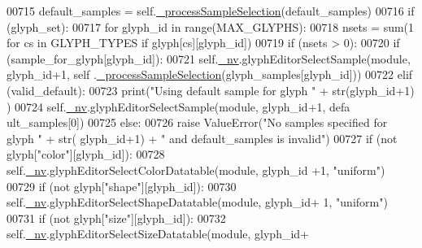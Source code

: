 \begin{DoxyCode}
00715         default\_samples = self.\hyperlink{classnavicom_1_1navicom_1_1NaviCom_a2acd087f6c61dc8c7e1bc5a3391ff982}{_processSampleSelection}(default\_samples)
00716         \textcolor{keywordflow}{if} (glyph\_set):
00717             \textcolor{keywordflow}{for} glyph\_id \textcolor{keywordflow}{in} range(MAX\_GLYPHS):
00718                 nsets = sum(1 \textcolor{keywordflow}{for} cs \textcolor{keywordflow}{in} GLYPH\_TYPES \textcolor{keywordflow}{if} glyph[cs][glyph\_id])
00719                 \textcolor{keywordflow}{if} (nsets > 0):
00720                     \textcolor{keywordflow}{if} (sample\_for\_glyph[glyph\_id]):
00721                         self.\hyperlink{classnavicom_1_1navicom_1_1NaviCom_afff3fd56fa16a68bab52ba8d801e325a}{_nv}.glyphEditorSelectSample(module, glyph\_id+1, self
      .\hyperlink{classnavicom_1_1navicom_1_1NaviCom_a2acd087f6c61dc8c7e1bc5a3391ff982}{_processSampleSelection}(glyph\_samples[glyph\_id]))
00722                     \textcolor{keywordflow}{elif} (valid\_default):
00723                         \textcolor{keywordflow}{print}(\textcolor{stringliteral}{"Using default sample for glyph "} + str(glyph\_id+1)
      )
00724                         self.\hyperlink{classnavicom_1_1navicom_1_1NaviCom_afff3fd56fa16a68bab52ba8d801e325a}{_nv}.glyphEditorSelectSample(module, glyph\_id+1, defa
      ult\_samples[0])
00725                     \textcolor{keywordflow}{else}:
00726                         \textcolor{keywordflow}{raise} ValueError(\textcolor{stringliteral}{"No samples specified for glyph "} + str(
      glyph\_id+1) + \textcolor{stringliteral}{" and default\_samples is invalid"})
00727                     \textcolor{keywordflow}{if} (\textcolor{keywordflow}{not} glyph[\textcolor{stringliteral}{"color"}][glyph\_id]):
00728                         self.\hyperlink{classnavicom_1_1navicom_1_1NaviCom_afff3fd56fa16a68bab52ba8d801e325a}{_nv}.glyphEditorSelectColorDatatable(module, glyph\_id
      +1, \textcolor{stringliteral}{"uniform"})
00729                     \textcolor{keywordflow}{if} (\textcolor{keywordflow}{not} glyph[\textcolor{stringliteral}{"shape"}][glyph\_id]):
00730                        self.\hyperlink{classnavicom_1_1navicom_1_1NaviCom_afff3fd56fa16a68bab52ba8d801e325a}{_nv}.glyphEditorSelectShapeDatatable(module, glyph\_id+
      1, \textcolor{stringliteral}{"uniform"})
00731                     \textcolor{keywordflow}{if} (\textcolor{keywordflow}{not} glyph[\textcolor{stringliteral}{"size"}][glyph\_id]):
00732                         self.\hyperlink{classnavicom_1_1navicom_1_1NaviCom_afff3fd56fa16a68bab52ba8d801e325a}{_nv}.glyphEditorSelectSizeDatatable(module, glyph\_id+

\end{DoxyCode}
